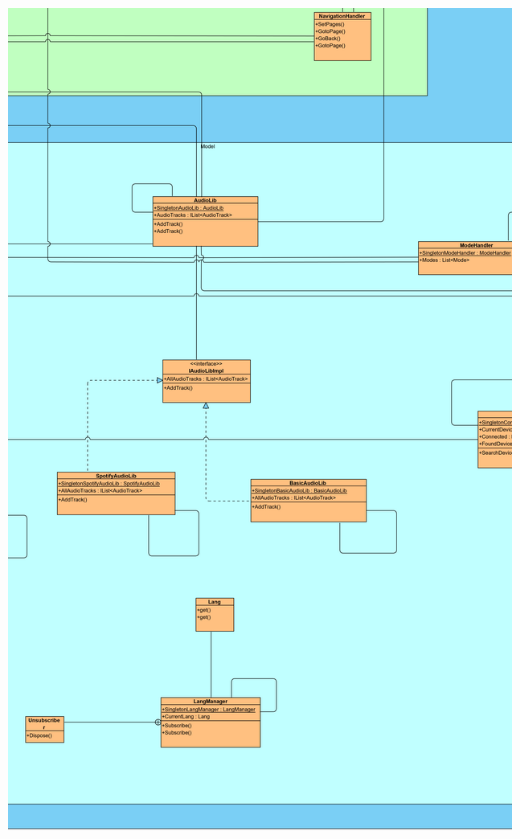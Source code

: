 \documentclass[../entwurf.tex]{subfiles}
\begin{document}
\includegraphics[scale=0.12]{../graphics/uml_diagramme/Gesamt/5.png}
\newpage
\end{document}
